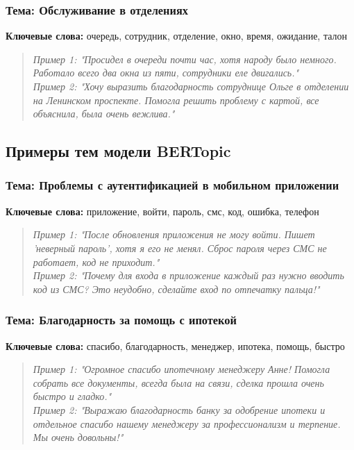 \documentclass{article}
\begin{document}
\subsubsection{Тема: Обслуживание в отделениях}
\textbf{Ключевые слова:} очередь, сотрудник, отделение, окно, время, ожидание, талон
\begin{quote}
\small
\textit{Пример 1: "Просидел в очереди почти час, хотя народу было немного. Работало всего два окна из пяти, сотрудники еле двигались."} \\
\textit{Пример 2: "Хочу выразить благодарность сотруднице Ольге в отделении на Ленинском проспекте. Помогла решить проблему с картой, все объяснила, была очень вежлива."}
\end{quote}

\subsection{Примеры тем модели BERTopic}

\subsubsection{Тема: Проблемы с аутентификацией в мобильном приложении}
\textbf{Ключевые слова:} приложение, войти, пароль, смс, код, ошибка, телефон
\begin{quote}
\small
\textit{Пример 1: "После обновления приложения не могу войти. Пишет 'неверный пароль', хотя я его не менял. Сброс пароля через СМС не работает, код не приходит."} \\
\textit{Пример 2: "Почему для входа в приложение каждый раз нужно вводить код из СМС? Это неудобно, сделайте вход по отпечатку пальца!"}
\end{quote}

\subsubsection{Тема: Благодарность за помощь с ипотекой}
\textbf{Ключевые слова:} спасибо, благодарность, менеджер, ипотека, помощь, быстро
\begin{quote}
\small
\textit{Пример 1: "Огромное спасибо ипотечному менеджеру Анне! Помогла собрать все документы, всегда была на связи, сделка прошла очень быстро и гладко."} \\
\textit{Пример 2: "Выражаю благодарность банку за одобрение ипотеки и отдельное спасибо нашему менеджеру за профессионализм и терпение. Мы очень довольны!"}
\end{quote}
\end{document}
